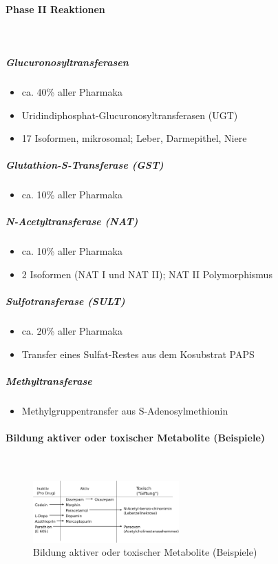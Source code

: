 \documentclass[10pt,a4paper]{report}
\begin{document}
\paragraph{Phase II Reaktionen} \mbox{}\\
\subparagraph{Glucuronosyltransferasen}
\begin{itemize}
	\item ca. 40\% aller Pharmaka
	\item Uridindiphosphat-Glucuronosyltransferasen (UGT)
	\item 17 Isoformen, mikrosomal; Leber, Darmepithel, Niere
\end{itemize}
\subparagraph{Glutathion-S-Transferase (GST)}
\begin{itemize}
	\item ca. 10\% aller Pharmaka
\end{itemize}
\subparagraph{N-Acetyltransferase (NAT) }
\begin{itemize}
	\item ca. 10\% aller Pharmaka
	\item 2 Isoformen (NAT I und NAT II); NAT II Polymorphismus
\end{itemize}
\subparagraph{Sulfotransferase (SULT)}
\begin{itemize}
	\item ca. 20\% aller Pharmaka
	\item Transfer eines Sulfat-Restes aus 
	dem Kosubstrat PAPS
\end{itemize}
\subparagraph{Methyltransferase}
\begin{itemize}
	\item Methylgruppentransfer aus S-Adenosylmethionin
\end{itemize}
\paragraph{Bildung aktiver oder toxischer Metabolite (Beispiele)} \mbox{} \\
\begin{figure}[h]
	\centering 
	\includegraphics[width=0.5\textwidth]{Pharmakodynamik.png} 
	\caption{Bildung aktiver oder toxischer Metabolite (Beispiele)} 
	\label{fig:Metabolite}
\end{figure}
\end{document}
